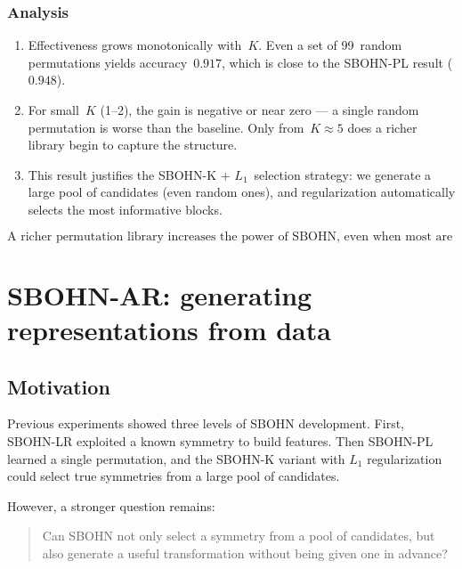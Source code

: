 \documentclass[11pt,a4paper]{report}
\begin{document}
\subsubsection{Analysis}

\begin{enumerate}
\item Effectiveness grows monotonically with~$K$. Even a set of 99~random permutations yields accuracy~$0.917$, which is close to the SBOHN-PL result ($0.948$).
\item For small~$K$ (1--2), the gain is negative or near zero --- a single random permutation is worse than the baseline. Only from~$K\approx 5$ does a richer library begin to capture the structure.
\item This result justifies the SBOHN-K + $L_1$~selection strategy: we generate a large pool of candidates (even random ones), and regularization automatically selects the most informative blocks.
\end{enumerate}

\[
\boxed{\text{A richer permutation library increases the power of SBOHN, even when most are random.}}
\]






\section{SBOHN-AR: generating representations from data}\label{sec:sbohn_ar}

\subsection{Motivation}

Previous experiments showed three levels of SBOHN development. First, SBOHN-LR exploited a known symmetry to build features. Then SBOHN-PL learned a single permutation, and the SBOHN-K variant with $L_1$ regularization could select true symmetries from a large pool of candidates.

However, a stronger question remains:

\begin{quote}
Can SBOHN not only select a symmetry from a pool of candidates, but also generate a useful transformation without being given one in advance?
\end{quote}
\end{document}
